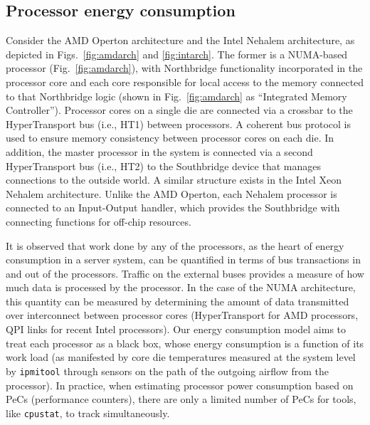\documentclass[prodmode,acmtaco,pdftex]{acmsmall}
\newcommand{\figurenames}{Figs.}
\newcommand{\figurename}{Fig.}
\begin{document}
\subsection{Processor energy consumption}
\label{sec:procmodel}
Consider the AMD Operton architecture and the Intel Nehalem
architecture, as depicted in \figurenames~\ref{fig:amdarch} and
\ref{fig:intarch}.  The former is a NUMA-based processor
(\figurename~\ref{fig:amdarch}), with Northbridge functionality
incorporated in the processor core and each core responsible for local
access to the memory connected to that Northbridge logic (shown in
\figurename~\ref{fig:amdarch} as ``Integrated Memory Controller'').
Processor cores on a single die are connected via a crossbar to the
HyperTransport bus (i.e., HT1) between processors.  A coherent bus
protocol is used to ensure memory consistency between processor cores on
each die.  In addition, the master processor in the system is connected
via a second HyperTransport bus (i.e., HT2) to the Southbridge device
that manages connections to the outside world.  A similar structure
exists in the Intel Xeon Nehalem architecture.  Unlike the AMD Operton,
each Nehalem processor is connected to an Input-Output handler, which
provides the Southbridge with connecting functions for off-chip resources.

It is observed that work done by any of the processors, as the heart of
energy consumption in a server system, can be quantified in terms of bus
transactions in and out of the processors.  Traffic on the external
buses provides a measure of how much data is processed by the processor.
In the case of the NUMA architecture, this quantity can be measured by
determining the amount of data transmitted over interconnect between
processor cores (HyperTransport for AMD processors, QPI links for recent
Intel processors). Our energy consumption model aims to treat each
processor as a black box, whose energy consumption is a function of its
work load (as manifested by core die temperatures measured at the system
level by \texttt{ipmitool} through sensors on the path of the outgoing
airflow from the processor).  In practice, when estimating processor
power consumption based on PeCs (performance counters), there are only a
limited number of PeCs for tools, like \texttt{cpustat}, to track
simultaneously.
\end{document}
